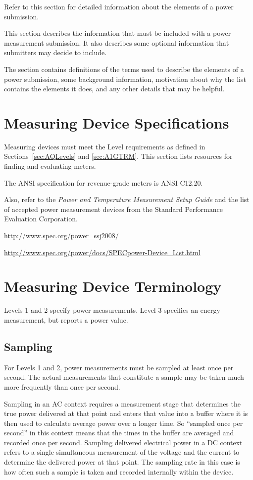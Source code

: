 \noindent
Refer to this section for detailed information about the elements of a power submission. 
\wl

\noindent
This section describes the information that must be included with a power measurement submission. It also describes some optional information that submitters may decide to include.
\wl

\noindent
The section contains definitions of the terms used to describe the elements of a power submission, some background information, motivation about why the list contains the elements it does, and any other details that may be helpful.
\noindent


\section{Measuring Device Specifications}
\label{sec:MDSpecs}
\noindent
Measuring devices must meet the Level requirements as defined in 
Sections~\ref{sec:AQLevels} and \ref{sec:A1GTRM}. This section lists resources for finding and evaluating meters.
\wl

\noindent
The ANSI specification for revenue-grade meters is ANSI C12.20. 
\wl

\noindent
Also, refer to 
the {\itshape Power and Temperature Measurement Setup Guide \/} and the list of accepted power measurement devices from the Standard Performance Evaluation Corporation.
\wl

\noindent
\url{http://www.spec.org/power_ssj2008/}

\noindent
\url{http://www.spec.org/power/docs/SPECpower-Device_List.html }

\section{Measuring Device Terminology}
\label{sec:MDTerm}
\noindent
Levels 1 and 2 specify power measurements. Level 3 specifies an energy measurement, but reports a power value.

\subsection{Sampling}
\noindent
For Levels 1 and 2, power measurements must be sampled at least once per second. The actual measurements that constitute a sample may be taken much more frequently than once per second. 
\wl

\noindent
Sampling in an AC context requires a measurement stage that determines the true power delivered at that point and enters that value into a buffer where it is then used to calculate average power over a longer time.  So ``sampled once per second'' in this context means that the times in the buffer are averaged and recorded once per second.
Sampling delivered electrical power in a DC context refers to a single simultaneous measurement of the voltage and the current to determine the delivered power at that point.  The sampling rate in this case is how often such a sample is taken and recorded internally within the device.  
\wl

